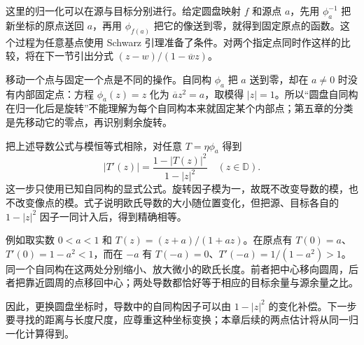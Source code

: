 \ProseParagraphBreak

这里的归一化可以在源与目标分别进行。给定圆盘映射 \(f\) 和源点 \(a\)，先用 \(\phi_a^{-1}\) 把新坐标的原点送回 \(a\)，再用 \(\phi_{f(a)}\) 把它的像送到零，就得到固定原点的函数。这个过程为任意基点使用 Schwarz 引理准备了条件。对两个指定点同时作这样的比较，将在下一节引出分式 \((z-w)/(1-\overline w z)\)。

\ProseParagraphBreak

移动一个点与固定一个点是不同的操作。自同构 \(\phi_a\) 把 \(a\) 送到零，却在 \(a\ne0\) 时没有内部固定点：方程 \(\phi_a(z)=z\) 化为 \(\overline a z^2=a\)，取模得 \(|z|=1\)。所以“圆盘自同构在归一化后是旋转”不能理解为每个自同构本来就固定某个内部点；第五章的分类是先移动它的零点，再识别剩余旋转。

\ProseParagraphBreak

把上述导数公式与模恒等式相除，对任意 \(T=\eta\phi_a\) 得到
\[
 |T'(z)|=\frac{1-|T(z)|^2}{1-|z|^2}\quad(z\in\mathbb D).
\]
这一步只使用已知自同构的显式公式。旋转因子模为一，故既不改变导数的模，也不改变像点的模。式子说明欧氏导数的大小随位置变化，但把源、目标各自的 \(1-|z|^2\) 因子一同计入后，得到精确相等。

\ProseParagraphBreak

例如取实数 \(0<a<1\) 和 \(T(z)=(z+a)/(1+az)\)。在原点有 \(T(0)=a\)、\(T'(0)=1-a^2<1\)，而在 \(-a\) 有 \(T(-a)=0\)、\(T'(-a)=1/(1-a^2)>1\)。同一个自同构在这两处分别缩小、放大微小的欧氏长度。前者把中心移向圆周，后者把靠近圆周的点移回中心；两处导数都恰好等于相应的目标余量与源余量之比。

\ProseParagraphBreak

因此，更换圆盘坐标时，导数中的自同构因子可以由 \(1-|z|^2\) 的变化补偿。下一步要寻找的距离与长度尺度，应尊重这种坐标变换；本章后续的两点估计将从同一归一化计算得到。
